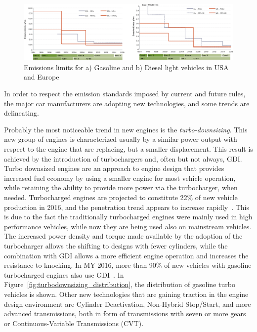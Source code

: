 \begin{figure}[ht]
  \centering
  \includegraphics[width=\textwidth]{figures/review/emissions_levels.png}
  \caption{Emissions limits for a) Gasoline and b) Diesel light vehicles in USA and Europe\label{fig:emission_levels} }
\end{figure}

In order to respect the emission standards imposed by current and future rules, the major car manufacturers are adopting new technologies, and some trends are delineating. 

Probably the most noticeable trend in new engines is the \emph{turbo-downsizing}. This new group of engines is characterized usually by a similar power output with respect to the engine that are replacing, but a smaller displacement. This result is achieved by the introduction of turbochargers and, often but not always, GDI. Turbo downsized engines are an approach to engine design that provides increased fuel economy by using a smaller engine for most vehicle operation, while retaining the ability to provide more power via the turbocharger, when needed. Turbocharged engines are projected to constitute 22\% of new vehicle production in 2016, and the penetration trend appears to increase rapidly~\cite{EPA2016}. This is due to the fact the traditionally turbocharged engines were mainly used in high performance vehicles, while now they are being used also on mainstream vehicles. The increased power density and torque made available by the adoption of the turbocharger allows the shifting to designs with fewer cylinders, while the combination with GDI allows a more efficient engine operation and increases the resistance to knocking. In MY 2016, more than 90\% of new vehicles with gasoline turbocharged engines also use GDI~\cite{EPA2016}. In Figure~\ref{fig:turbodownsizing_distribution}, the distribution of gasoline turbo vehicles is shown. Other new technologies that are gaining traction in the engine design environment are Cylinder Deactivation, Non-Hybrid Stop/Start, and more advanced transmissions, both in form of transmissions with seven or more gears or Continuous-Variable Transmissions (CVT).

